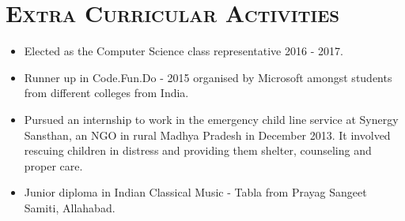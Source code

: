 \documentclass{article}
\newcommand{\tmpsection}[1]{}
\let\tmpsection=\section
\renewcommand{\section}[1]{\tmpsection*{\textsc{#1}}}
\begin{document}
\section{Extra Curricular Activities}

\begin{itemize}
    \setlength\itemsep{0em}
    \item Elected as the Computer Science class representative 2016 - 2017.
    \item Runner up in Code.Fun.Do - 2015 organised by Microsoft amongst students from different colleges from India.
    \item Pursued an internship to work in the emergency child line service at Synergy Sansthan, an NGO in rural Madhya Pradesh in December 2013. It involved rescuing children in distress and providing them shelter, counseling and proper care.
    \item Junior diploma in Indian Classical Music - Tabla from Prayag Sangeet Samiti, Allahabad. 
\end{itemize}
\end{document}
